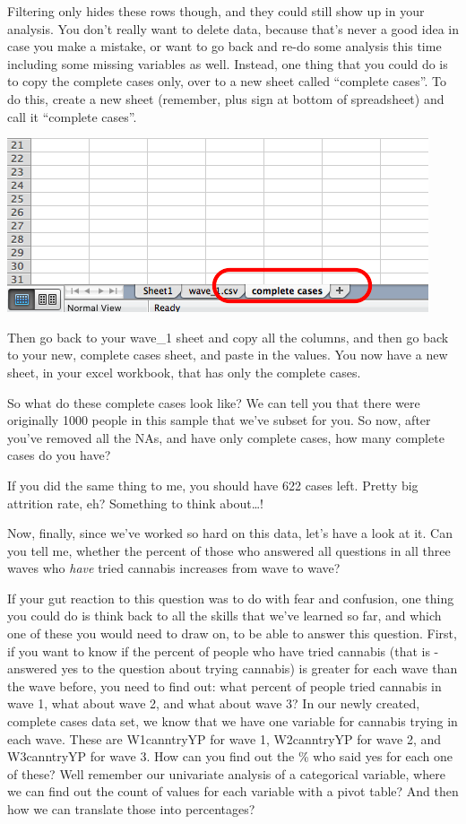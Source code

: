 \documentclass[
]{book}
\begin{document}
Filtering only hides these rows though, and they could still show up in your analysis. You don't really want to delete data, because that's never a good idea in case you make a mistake, or want to go back and re-do some analysis this time including some missing variables as well. Instead, one thing that you could do is to copy the complete cases only, over to a new sheet called ``complete cases''. To do this, create a new sheet (remember, plus sign at bottom of spreadsheet) and call it ``complete cases''.

\includegraphics{imgs/cc_new_sheet.png}

Then go back to your wave\_1 sheet and copy all the columns, and then go back to your new, complete cases sheet, and paste in the values. You now have a new sheet, in your excel workbook, that has only the complete cases.

So what do these complete cases look like? We can tell you that there were originally 1000 people in this sample that we've subset for you. So now, after you've removed all the NAs, and have only complete cases, how many complete cases do you have?

If you did the same thing to me, you should have 622 cases left. Pretty big attrition rate, eh? Something to think about\ldots!

Now, finally, since we've worked so hard on this data, let's have a look at it. Can you tell me, whether the percent of those who answered all questions in all three waves who \emph{have} tried cannabis increases from wave to wave?

If your gut reaction to this question was to do with fear and confusion, one thing you could do is think back to all the skills that we've learned so far, and which one of these you would need to draw on, to be able to answer this question. First, if you want to know if the percent of people who have tried cannabis (that is - answered yes to the question about trying cannabis) is greater for each wave than the wave before, you need to find out: what percent of people tried cannabis in wave 1, what about wave 2, and what about wave 3? In our newly created, complete cases data set, we know that we have one variable for cannabis trying in each wave. These are W1canntryYP for wave 1, W2canntryYP for wave 2, and W3canntryYP for wave 3. How can you find out the \% who said yes for each one of these? Well remember our univariate analysis of a categorical variable, where we can find out the count of values for each variable with a pivot table? And then how we can translate those into percentages?
\end{document}
